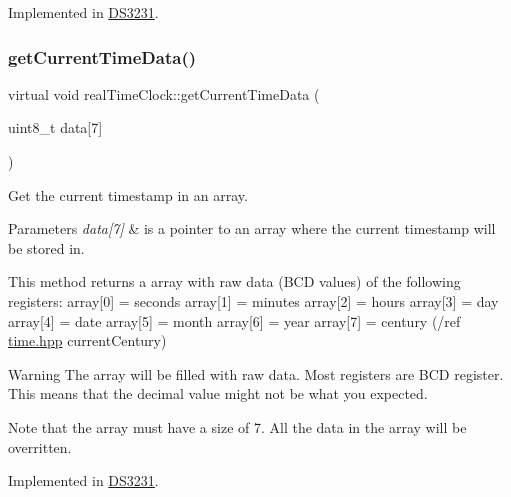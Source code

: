 Implemented in \mbox{\hyperlink{class_d_s3231_aa31acb133cc63aa7a2a25eda6244c9df}{D\+S3231}}.

\mbox{\label{classreal_time_clock_a2d1613b3cd572f62bc9faaea6a0f82f2}} 
\subsubsection{\texorpdfstring{get\+Current\+Time\+Data()}{getCurrentTimeData()}}
{\footnotesize\ttfamily virtual void real\+Time\+Clock\+::get\+Current\+Time\+Data (\begin{DoxyParamCaption}\item[{uint8\+\_\+t}]{data\mbox{[}7\mbox{]} }\end{DoxyParamCaption})\hspace{0.3cm}{\ttfamily [pure virtual]}}



Get the current timestamp in an array. 


\begin{DoxyParams}{Parameters}
{\em data\mbox{[}7\mbox{]}} & is a pointer to an array where the current timestamp will be stored in.\\
\hline
\end{DoxyParams}
This method returns a array with raw data (B\+CD values) of the following registers\+: array\mbox{[}0\mbox{]} = seconds array\mbox{[}1\mbox{]} = minutes array\mbox{[}2\mbox{]} = hours array\mbox{[}3\mbox{]} = day array\mbox{[}4\mbox{]} = date array\mbox{[}5\mbox{]} = month array\mbox{[}6\mbox{]} = year array\mbox{[}7\mbox{]} = century (/ref \mbox{\hyperlink{time_8hpp_source}{time.\+hpp}} current\+Century) \begin{DoxyWarning}{Warning}
The array will be filled with raw data. Most registers are B\+CD register. This means that the decimal value might not be what you expected. 

Note that the array must have a size of 7. All the data in the array will be overritten. 
\end{DoxyWarning}


Implemented in \mbox{\hyperlink{class_d_s3231_a0ca41c2242367c5ff1424d1b12f909c5}{D\+S3231}}.

\mbox{\label{classreal_time_clock_a08a7854ef9cef638996a267a953c9b14}} 
